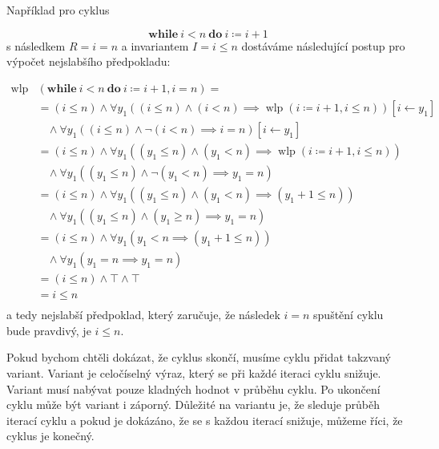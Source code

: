 Například pro cyklus

\begin{equation*}
    \textbf{while} \ i < n \ \textbf{do} \ i \coloneqq i + 1
\end{equation*}
s následkem $R = i = n$ a invariantem $I = i \leq n$ dostáváme následující postup pro výpočet nejslabšího předpokladu:

\begin{align*}
    \operatorname{wlp}&(\textbf{while} \ i < n \ \textbf{do} \ i \coloneqq i + 1, i = n) = \\
        & = (i \leq n) \land \forall y_1 \left( (i \leq n) \land (i < n) \implies \operatorname{wlp}(i \coloneqq i + 1, i \leq n) \right)[i \leftarrow y_1] \\
        & \ \ \ \ \land \forall y_1 \left( (i \leq n) \land \neg (i < n) \implies i = n \right)[i \leftarrow y_1] \\
        & = (i \leq n) \land \forall y_1 \left( (y_1 \leq n) \land (y_1 < n) \implies \operatorname{wlp}(i \coloneqq i + 1, i \leq n) \right) \\
        & \ \ \ \ \land \forall y_1 \left( (y_1 \leq n) \land \neg (y_1 < n) \implies y_1 = n \right) \\
        & = (i \leq n) \land \forall y_1 \left( (y_1 \leq n) \land (y_1 < n) \implies (y_1 + 1 \leq n) \right) \\
        & \ \ \ \ \land \forall y_1 \left( (y_1 \leq n) \land (y_1 \geq n) \implies y_1 = n \right) \\
        & = (i \leq n) \land \forall y_1 \left( y_1 < n \implies (y_1 + 1 \leq n) \right) \\
        & \ \ \ \ \land \forall y_1 \left( y_1 = n \implies y_1 = n \right) \\
        & = (i \leq n) \land \top \land \top \\
        & = i \leq n \\
\end{align*}
a tedy nejslabší předpoklad, který zaručuje, že následek $i = n$ spuštění cyklu bude pravdivý, je $i \leq n$.

Pokud bychom chtěli dokázat, že cyklus skončí, musíme cyklu přidat takzvaný variant.
Variant je celočíselný výraz, který se při každé iteraci cyklu snižuje.
Variant musí nabývat pouze kladných hodnot v průběhu cyklu.
Po ukončení cyklu může být variant i záporný.
Důležité na variantu je, že sleduje průběh iterací cyklu a pokud
je dokázáno, že se s každou iterací snižuje, můžeme říci, že cyklus je konečný.

